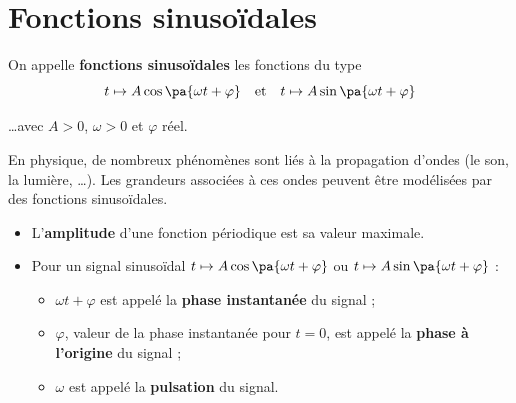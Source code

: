 \begin{ex}
	\nline
	\begin{center}
	\end{center}
\end{ex}

\section{Fonctions sinusoïdales}

\begin{defin}
	On appelle \textbf{fonctions sinusoïdales} les fonctions du type
	\[
		t \mapsto A\cos\pa{\omega t + \varphi} \quad\text{et}\quad t \mapsto A\sin\pa{\omega t + \varphi}
	\]

	\ldots avec $A > 0$, $\omega > 0$ et $\varphi$ réel.
\end{defin}

\begin{rem}
	En physique, de nombreux phénomènes sont liés à la propagation d'ondes (le son, la lumière, \dots). Les grandeurs associées à ces ondes peuvent être modélisées par des fonctions sinusoïdales.
\end{rem}

\begin{defin}
	\nline
	\begin{itemize}
		\item L'\textbf{amplitude} d'une fonction périodique est sa valeur maximale.
		\item Pour un signal sinusoïdal $t \mapsto A\cos\pa{\omega t + \varphi}$ ou $t \mapsto A\sin\pa{\omega t + \varphi}$ :
		      \begin{itemize}
			      \item $\omega t + \varphi$ est appelé la \textbf{phase instantanée} du signal ;
			      \item $\varphi$, valeur de la phase instantanée pour $t = 0$, est appelé la \textbf{phase à l'origine} du signal ;
			      \item $\omega$ est appelé la \textbf{pulsation} du signal.
		      \end{itemize}
	\end{itemize}
\end{defin}

